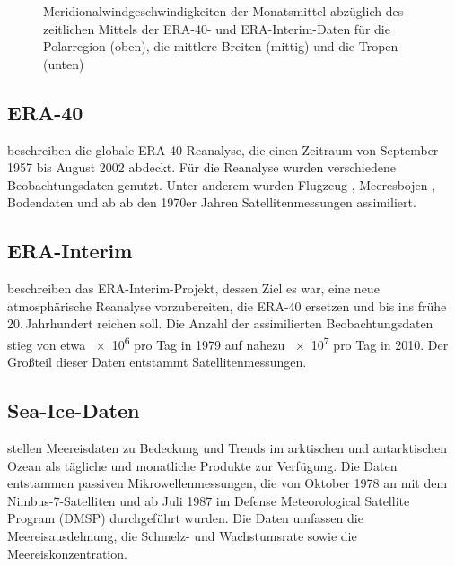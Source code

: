 \begin{figure}[H]
  \begin{minipage}{\textwidth}
    \centering
  \end{minipage}
  \begin{minipage}{\textwidth}
    \centering
  \end{minipage}
  \begin{minipage}{\textwidth}
    \centering
  \end{minipage}
  \caption[Homogenitätsanalyse des Meridionalwinds für ERA-40 und ERA-Interim]{Meridionalwindgeschwindigkeiten der Monatsmittel abzüglich des zeitlichen Mittels der ERA-40- und ERA-Interim-Daten für die Polarregion (oben), die mittlere Breiten (mittig) und die Tropen (unten)} \label{fig:anom-era-v}
\end{figure}

\subsection{ERA-40}
\citep{uppala-2005} beschreiben die globale ERA-40-Reanalyse, die einen Zeitraum von September \num{1957} bis August \num{2002} abdeckt. Für die Reanalyse wurden verschiedene Beobachtungsdaten genutzt. Unter anderem wurden Flugzeug-, Meeresbojen-, Bodendaten und ab ab den \num{1970}er Jahren Satellitenmessungen assimiliert.
\subsection{ERA-Interim}
\citep{dee-2011} beschreiben das ERA-Interim-Projekt, dessen Ziel es war, eine neue atmosphärische Reanalyse vorzubereiten, die ERA-40 ersetzen und bis ins frühe 20.\,Jahrhundert reichen soll. Die Anzahl der assimilierten Beobachtungsdaten stieg von etwa \num{e6} pro Tag in \num{1979} auf nahezu \num{e7} pro Tag in \num{2010}. Der Großteil dieser Daten entstammt Satellitenmessungen.
\subsection{Sea-Ice-Daten}
\citep{sii-2016} stellen Meereisdaten zu Bedeckung und Trends im arktischen und antarktischen Ozean als tägliche und monatliche Produkte zur Verfügung. Die Daten entstammen passiven Mikrowellenmessungen, die von Oktober 1978 an mit dem Nimbus-7-Satelliten und ab Juli 1987 im Defense Meteorological Satellite Program (DMSP) durchgeführt wurden. Die Daten umfassen die Meereisausdehnung, die Schmelz- und Wachstumsrate sowie die Meereiskonzentration.

